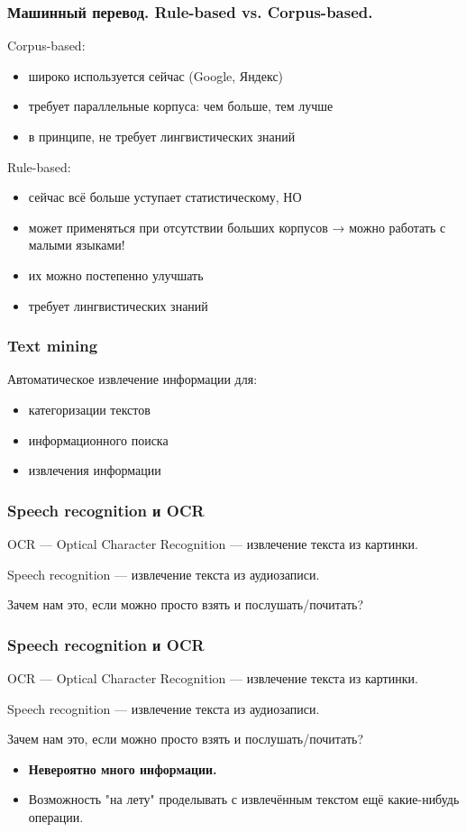 \documentclass[10pt, compress]{beamer}
\begin{document}
\begin{frame}
  \frametitle{Машинный перевод. Rule-based vs. Corpus-based.} 
  Corpus-based:
  \begin{itemize}
  \item широко используется сейчас (Google, Яндекс)
  \item требует параллельные корпуса: чем больше, тем лучше
  \item в принципе, не требует лингвистических знаний
  \end{itemize}
  Rule-based:
  \begin{itemize}
  \item сейчас всё больше уступает статистическому, \alert{НО}
  \item может применяться при отсутствии больших корпусов → можно работать с малыми языками!
  \item их можно постепенно улучшать
  \item требует лингвистических знаний
  \end{itemize}
\end{frame}

\begin{frame}
  \frametitle{Text mining} 
  Автоматическое извлечение информации для:
  \begin{itemize}
  \item категоризации текстов
  \item информационного поиска
  \item извлечения информации
  \end{itemize}
\end{frame}
  
\begin{frame}
  \frametitle{Speech recognition и OCR}
  OCR --- Optical Character Recognition --- извлечение текста из картинки.
  
  Speech recognition --- извлечение текста из аудиозаписи.
  
  Зачем нам это, если можно просто взять и послушать/почитать?
\end{frame}

\begin{frame}
  \frametitle{Speech recognition и OCR}
  OCR --- Optical Character Recognition --- извлечение текста из картинки.
  
  Speech recognition --- извлечение текста из аудиозаписи.
  
  Зачем нам это, если можно просто взять и послушать/почитать?
  \begin{itemize}
  \item \textbf{Невероятно много информации.} 
  \item Возможность "на лету" проделывать с извлечённым текстом ещё какие-нибудь операции.
  \end{itemize}
\end{frame}
\end{document}
